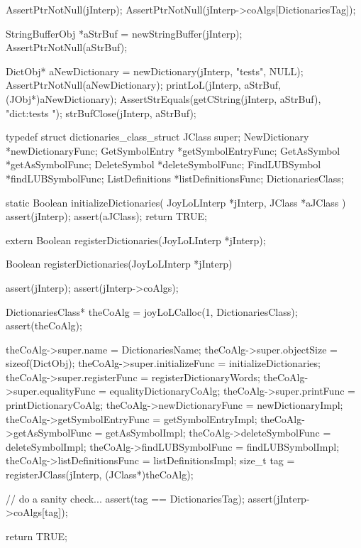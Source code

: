 
\startCTest
  AssertPtrNotNull(jInterp);
  AssertPtrNotNull(jInterp->coAlgs[DictionariesTag]);

  StringBufferObj *aStrBuf = newStringBuffer(jInterp);
  AssertPtrNotNull(aStrBuf);
  
  DictObj* aNewDictionary = newDictionary(jInterp, "tests", NULL);
  AssertPtrNotNull(aNewDictionary);
  printLoL(jInterp, aStrBuf, (JObj*)aNewDictionary);
  AssertStrEquals(getCString(jInterp, aStrBuf), "dict:tests ");
  strBufClose(jInterp, aStrBuf);
\stopCTest
\stopTestCase
\stopTestSuite

\startTestSuite[registerDictionaries]

\startCHeader
typedef struct dictionaries_class_struct {
  JClass           super;
  NewDictionary   *newDictionaryFunc;
  GetSymbolEntry  *getSymbolEntryFunc;
  GetAsSymbol     *getAsSymbolFunc;
  DeleteSymbol    *deleteSymbolFunc;
  FindLUBSymbol   *findLUBSymbolFunc;
  ListDefinitions *listDefinitionsFunc;  
} DictionariesClass;

\stopCHeader

\startCCode
static Boolean initializeDictionaries(
  JoyLoLInterp *jInterp,
  JClass       *aJClass
) {
  assert(jInterp);
  assert(aJClass);
  return TRUE;
}
\stopCCode

\startCHeader
extern Boolean registerDictionaries(JoyLoLInterp *jInterp);
\stopCHeader
{}

\startCCode
Boolean registerDictionaries(JoyLoLInterp *jInterp) {
  assert(jInterp);
  assert(jInterp->coAlgs);
  
  DictionariesClass* theCoAlg
    = joyLoLCalloc(1, DictionariesClass);
  assert(theCoAlg);
  
  theCoAlg->super.name           = DictionariesName;
  theCoAlg->super.objectSize     = sizeof(DictObj);
  theCoAlg->super.initializeFunc = initializeDictionaries;
  theCoAlg->super.registerFunc   = registerDictionaryWords;
  theCoAlg->super.equalityFunc   = equalityDictionaryCoAlg;
  theCoAlg->super.printFunc      = printDictionaryCoAlg;
  theCoAlg->newDictionaryFunc    = newDictionaryImpl;
  theCoAlg->getSymbolEntryFunc   = getSymbolEntryImpl;
  theCoAlg->getAsSymbolFunc      = getAsSymbolImpl;
  theCoAlg->deleteSymbolFunc     = deleteSymbolImpl;
  theCoAlg->findLUBSymbolFunc    = findLUBSymbolImpl;
  theCoAlg->listDefinitionsFunc  = listDefinitionsImpl;  
  size_t tag =
    registerJClass(jInterp, (JClass*)theCoAlg);
  
  // do a sanity check...
  assert(tag == DictionariesTag);
  assert(jInterp->coAlgs[tag]);
   
  return TRUE;
}
\stopCCode

